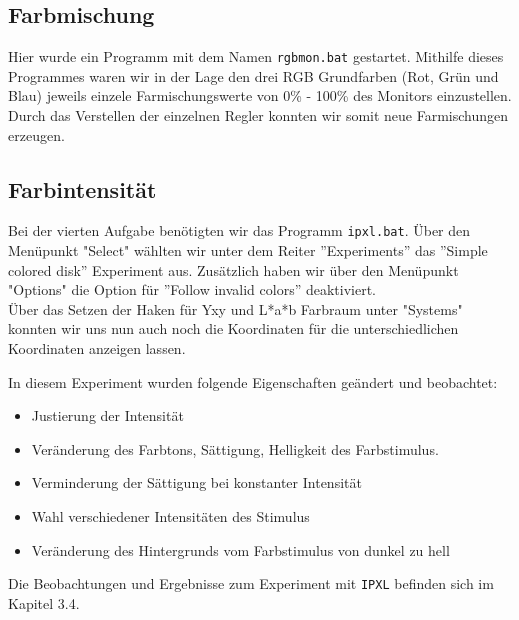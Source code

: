 \documentclass[a4paper]{article}
\begin{document}
\subsection{Farbmischung}

Hier wurde ein Programm mit dem Namen \texttt{rgbmon.bat} gestartet. Mithilfe dieses Programmes waren wir in der Lage den drei RGB Grundfarben (Rot, Grün und Blau) jeweils einzele Farmischungswerte von 0\% - 100\% des Monitors einzustellen. Durch das Verstellen der einzelnen Regler konnten wir somit neue Farmischungen erzeugen.

\subsection{Farbintensität}

Bei der vierten Aufgabe benötigten wir das Programm \texttt{ipxl.bat}. Über den Menüpunkt "Select" wählten wir unter dem Reiter ''Experiments'' das ''Simple colored disk'' Experiment aus. Zusätzlich haben wir über den Menüpunkt "Options" die Option für ''Follow invalid colors'' deaktiviert. \\

\noindent Über das Setzen der Haken für Yxy und L*a*b Farbraum unter "Systems" konnten wir uns nun auch noch die Koordinaten für die unterschiedlichen Koordinaten anzeigen lassen. 

\noindent In diesem Experiment wurden folgende Eigenschaften geändert und beobachtet:

\begin{itemize}
    \item Justierung der Intensität
    \item Veränderung des Farbtons, Sättigung, Helligkeit des Farbstimulus.
    \item Verminderung der Sättigung bei konstanter Intensität
    \item Wahl verschiedener Intensitäten des Stimulus
    \item Veränderung des Hintergrunds vom Farbstimulus von dunkel zu hell
\end{itemize}

\noindent Die Beobachtungen und Ergebnisse zum Experiment mit \texttt{IPXL} befinden sich im Kapitel 3.4.

\newpage
\end{document}
